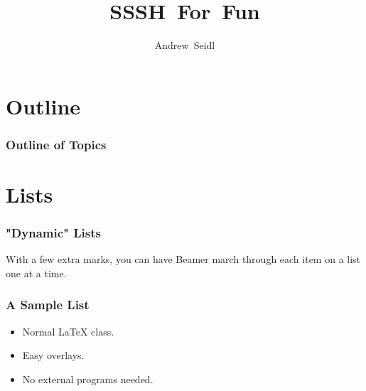 \documentclass{beamer}
\title[Sssh config for fun]{SSSH~For~Fun}
\author[seidl]{Andrew~Seidl\inst{1}}
\institute[UW Madison]{\inst{1}%
University of Winsoncin}
\begin{document}

\frame
{
    \titlepage
}
\section*{Outline}
\frame
{
    \frametitle{Outline of Topics}

    \tableofcontents
}
\section{Lists}
\frame
{
    \frametitle{"Dynamic" Lists}

    With a few extra marks, you can have Beamer march
    through each item on a list one at a time.
}
\frame
{
    \frametitle{A Sample List}

    \begin{itemize}
        \item<1-> Normal LaTeX class.
        \item<2-> Easy overlays.
        \item<3-> No external programs needed.
    \end{itemize}
}
\end{document}

